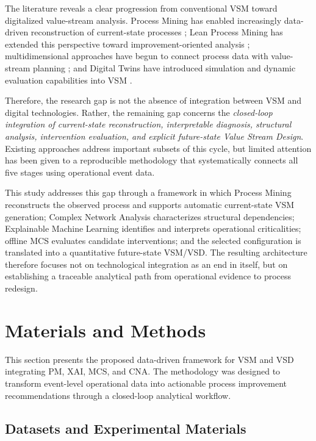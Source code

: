 \documentclass[pdflatex,iicol,Numbered,sn-basic]{sn-jnl}
\begin{document}
The literature reveals a clear progression from conventional VSM toward
digitalized value-stream analysis. Process Mining has enabled increasingly
data-driven reconstruction of current-state processes
\cite{HorsthoferRauch2024SustainabilityVSM,Teriete2026VSMProcessMining};
Lean Process Mining has extended this perspective toward improvement-oriented
analysis \cite{Khakpour2025LeanProcessMining}; multidimensional approaches have
begun to connect process data with value-stream planning
\cite{Kroeger2025MultidimensionalPM}; and Digital Twins have introduced
simulation and dynamic evaluation capabilities into VSM
\cite{Reslan2025VSMDigitalTwin}.

Therefore, the research gap is not the absence of integration between VSM and
digital technologies. Rather, the remaining gap concerns the
\emph{closed-loop integration of current-state reconstruction, interpretable
diagnosis, structural analysis, intervention evaluation, and explicit
future-state Value Stream Design}. Existing approaches address important
subsets of this cycle, but limited attention has been given to a reproducible
methodology that systematically connects all five stages using operational
event data.

This study addresses this gap through a framework in which Process Mining
reconstructs the observed process and supports automatic current-state VSM
generation; Complex Network Analysis characterizes structural dependencies;
Explainable Machine Learning identifies and interprets operational
criticalities; offline MCS evaluates candidate interventions; and
the selected configuration is translated into a quantitative future-state
VSM/VSD. The resulting architecture therefore focuses not on technological
integration as an end in itself, but on establishing a traceable analytical
path from operational evidence to process redesign.

\section{Materials and Methods}

This section presents the proposed data-driven framework for VSM and VSD integrating PM, XAI, MCS, and CNA. The methodology was designed to transform event-level operational data into actionable process improvement recommendations through a closed-loop analytical workflow.

\subsection{Datasets and Experimental Materials}
\label{subsec:datasets}
\end{document}
